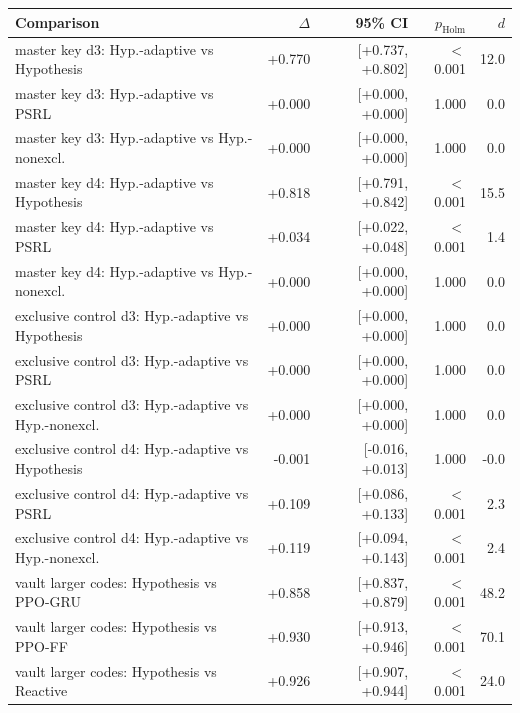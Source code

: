 \begin{tabular}{lrrrr}
\toprule
Comparison & $\Delta$ & 95\% CI & $p_{\text{Holm}}$ & $d$ \\
\midrule
master key d3: Hyp.-adaptive vs Hypothesis & +0.770 & [+0.737, +0.802] & $<$0.001 & 12.0 \\
master key d3: Hyp.-adaptive vs PSRL & +0.000 & [+0.000, +0.000] & 1.000 & 0.0 \\
master key d3: Hyp.-adaptive vs Hyp.-nonexcl. & +0.000 & [+0.000, +0.000] & 1.000 & 0.0 \\
master key d4: Hyp.-adaptive vs Hypothesis & +0.818 & [+0.791, +0.842] & $<$0.001 & 15.5 \\
master key d4: Hyp.-adaptive vs PSRL & +0.034 & [+0.022, +0.048] & $<$0.001 & 1.4 \\
master key d4: Hyp.-adaptive vs Hyp.-nonexcl. & +0.000 & [+0.000, +0.000] & 1.000 & 0.0 \\
exclusive control d3: Hyp.-adaptive vs Hypothesis & +0.000 & [+0.000, +0.000] & 1.000 & 0.0 \\
exclusive control d3: Hyp.-adaptive vs PSRL & +0.000 & [+0.000, +0.000] & 1.000 & 0.0 \\
exclusive control d3: Hyp.-adaptive vs Hyp.-nonexcl. & +0.000 & [+0.000, +0.000] & 1.000 & 0.0 \\
exclusive control d4: Hyp.-adaptive vs Hypothesis & -0.001 & [-0.016, +0.013] & 1.000 & -0.0 \\
exclusive control d4: Hyp.-adaptive vs PSRL & +0.109 & [+0.086, +0.133] & $<$0.001 & 2.3 \\
exclusive control d4: Hyp.-adaptive vs Hyp.-nonexcl. & +0.119 & [+0.094, +0.143] & $<$0.001 & 2.4 \\
\midrule
vault larger codes: Hypothesis vs PPO-GRU & +0.858 & [+0.837, +0.879] & $<$0.001 & 48.2 \\
vault larger codes: Hypothesis vs PPO-FF & +0.930 & [+0.913, +0.946] & $<$0.001 & 70.1 \\
vault larger codes: Hypothesis vs Reactive & +0.926 & [+0.907, +0.944] & $<$0.001 & 24.0 \\
\bottomrule
\end{tabular}
